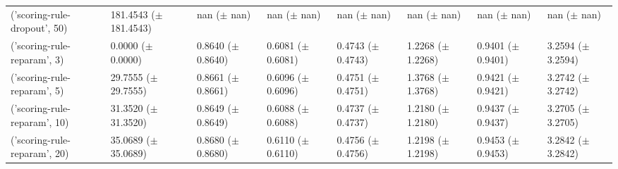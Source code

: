 \begin{tabular}{llllllll}
('scoring-rule-dropout', 50) & \makecell{181.4543 \\ ($\pm$ 181.4543)} & \makecell{nan \\ ($\pm$ nan)} & \makecell{nan \\ ($\pm$ nan)} & \makecell{nan \\ ($\pm$ nan)} & \makecell{nan \\ ($\pm$ nan)} & \makecell{nan \\ ($\pm$ nan)} & \makecell{nan \\ ($\pm$ nan)} \\
('scoring-rule-reparam', 3) & \makecell{0.0000 \\ ($\pm$ 0.0000)} & \makecell{0.8640 \\ ($\pm$ 0.8640)} & \makecell{0.6081 \\ ($\pm$ 0.6081)} & \makecell{0.4743 \\ ($\pm$ 0.4743)} & \makecell{1.2268 \\ ($\pm$ 1.2268)} & \makecell{0.9401 \\ ($\pm$ 0.9401)} & \makecell{3.2594 \\ ($\pm$ 3.2594)} \\
('scoring-rule-reparam', 5) & \makecell{29.7555 \\ ($\pm$ 29.7555)} & \makecell{0.8661 \\ ($\pm$ 0.8661)} & \makecell{0.6096 \\ ($\pm$ 0.6096)} & \makecell{0.4751 \\ ($\pm$ 0.4751)} & \makecell{1.3768 \\ ($\pm$ 1.3768)} & \makecell{0.9421 \\ ($\pm$ 0.9421)} & \makecell{3.2742 \\ ($\pm$ 3.2742)} \\
('scoring-rule-reparam', 10) & \makecell{31.3520 \\ ($\pm$ 31.3520)} & \makecell{0.8649 \\ ($\pm$ 0.8649)} & \makecell{0.6088 \\ ($\pm$ 0.6088)} & \makecell{0.4737 \\ ($\pm$ 0.4737)} & \makecell{1.2180 \\ ($\pm$ 1.2180)} & \makecell{0.9437 \\ ($\pm$ 0.9437)} & \makecell{3.2705 \\ ($\pm$ 3.2705)} \\
('scoring-rule-reparam', 20) & \makecell{35.0689 \\ ($\pm$ 35.0689)} & \makecell{0.8680 \\ ($\pm$ 0.8680)} & \makecell{0.6110 \\ ($\pm$ 0.6110)} & \makecell{0.4756 \\ ($\pm$ 0.4756)} & \makecell{1.2198 \\ ($\pm$ 1.2198)} & \makecell{0.9453 \\ ($\pm$ 0.9453)} & \makecell{3.2842 \\ ($\pm$ 3.2842)} \\

\end{tabular}
